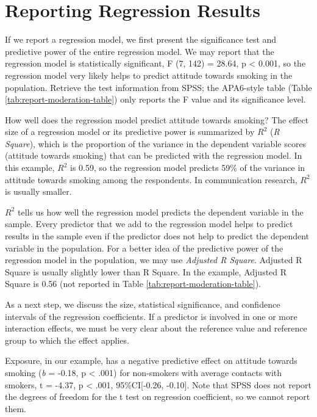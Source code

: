 \documentclass[a4paper]{book}
\theoremstyle{definition}
\theoremstyle{definition}
\theoremstyle{definition}
\theoremstyle{remark}
\begin{document}
\section{Reporting Regression Results}\label{reportmoderation}

If we report a regression model, we first present the significance test
and predictive power of the entire regression model. We may report that
the regression model is statistically significant, F (7, 142) = 28.64, p
\textless{} 0.001, so the regression model very likely helps to predict
attitude towards smoking in the population. Retrieve the test
information from SPSS; the APA6-style table (Table
\ref{tab:report-moderation-table}) only reports the F value and its
significance level.

How well does the regression model predict attitude towards smoking? The
effect size of a regression model or its predictive power is summarized
by \(R^2\) (\emph{R Square}), which is the proportion of the variance in
the dependent variable scores (attitude towards smoking) that can be
predicted with the regression model. In this example, \(R^2\) is 0.59,
so the regression model predicts 59\% of the variance in attitude
towards smoking among the respondents. In communication research,
\(R^2\) is usually smaller.

\(R^2\) tells us how well the regression model predicts the dependent
variable in the sample. Every predictor that we add to the regression
model helps to predict results in the sample even if the predictor does
not help to predict the dependent variable in the population. For a
better idea of the predictive power of the regression model in the
population, we may use \emph{Adjusted R Square}. Adjusted R Square is
usually slightly lower than R Square. In the example, Adjusted R Square
is 0.56 (not reported in Table \ref{tab:report-moderation-table}).

As a next step, we discuss the size, statistical significance, and
confidence intervals of the regression coefficients. If a predictor is
involved in one or more interaction effects, we must be very clear about
the reference value and reference group to which the effect applies.

Exposure, in our example, has a negative predictive effect on attitude
towards smoking (\emph{b} = -0.18, p \textless{} .001) for non-smokers
with average contacts with smokers, t = -4.37, p \textless{} .001,
95\%CI{[}-0.26, -0.10{]}. Note that SPSS does not report the degrees of
freedom for the t test on regression coefficient, so we cannot report
them.
\end{document}
